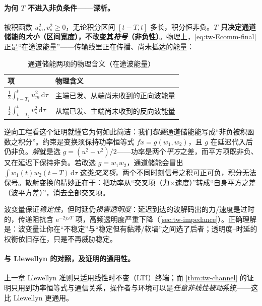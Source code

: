 \paragraph{为何 $T$ 不进入非负条件——深析。}
被积函数 $u_m^2,v_s^2\ge0$，无论积分区间 $[t-T,t]$ 多长，积分恒非负。\textbf{$T$ 只决定通道储能的\emph{大小}（区间宽度），不改变其\emph{符号}（非负性）}。物理上，\cref{eq:tw-Ecomm-final} 正是“在途波能量”——传输线里正在传播、尚未抵达的能量：

\begin{table}[H]\centering\small
\caption{通道储能两项的物理含义（在途波能量）}
\label{tab:tw-pipe-energy}
\begin{tabular}{ll}
\toprule
项 & 物理含义 \\
\midrule
$\tfrac12\int_{t-T_1}^{t}u_m^2\,\mathrm d\tau$ & 主端已发、从端尚未收到的正向波能量 \\
$\tfrac12\int_{t-T_2}^{t}v_s^2\,\mathrm d\tau$ & 从端已发、主端尚未收到的反向波能量 \\
\bottomrule
\end{tabular}
\end{table}

\begin{insight}
逆向工程看这个证明就懂它为何如此简洁：我们\emph{想要}通道储能能写成“非负被积函数之积分”。约束是变换须保持功率恒等式 $f\dot x=g(w_1,w_2)$，且 $g$ 在延迟代入后仍非负。\emph{解}就是选 $g=(u^2-v^2)/2$——功率是两个\emph{平方}之差，而平方项既非负、又在延迟下保持非负。若改选 $g=w_1w_2$，通道储能会冒出 $\int w_1(t)w_2(t-T)\,\mathrm d\tau$ 这类\emph{交叉项}，两个不同时刻信号之积可正可负，积分无法保号。散射变换的精妙正在于：把功率从“交叉项（力$\times$速度）”转成“自身平方之差（波平方差）”，消去全部交叉项。
\end{insight}

\begin{pitfall}[“波变量消除了时延的影响”]
波变量保证\emph{稳定性}，但时延仍\emph{损害透明度}：延迟到达的波解码出的力/速度是过时的，传递阻抗含 $\mathrm e^{-2\mathrm j\omega T}$ 项，高频透明度严重下降（\cref{sec:tw-impedance}）。正确理解是：波变量让你在“不稳定”与“稳定但有黏滞/软墙”之间选了后者；透明度--时延的权衡依旧存在，只是不再威胁稳定。
\end{pitfall}

\paragraph{与 Llewellyn 的对照，及证明的通用性。}
上一章 Llewellyn 准则只适用线性时不变（LTI）终端；而 \cref{thm:tw-channel} 的证明只用到功率恒等式与通信关系，操作者与环境可以是\emph{任意非线性被动}系统——这比 Llewellyn 更通用。

